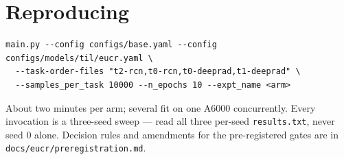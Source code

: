 \documentclass{article}
\begin{document}
\section{Reproducing}

\begin{verbatim}
main.py --config configs/base.yaml --config configs/models/til/eucr.yaml \
  --task-order-files "t2-rcn,t0-rcn,t0-deeprad,t1-deeprad" \
  --samples_per_task 10000 --n_epochs 10 --expt_name <arm>
\end{verbatim}

About two minutes per arm; several fit on one A6000 concurrently. Every
invocation is a three-seed sweep --- read all three per-seed
\texttt{results.txt}, never seed 0 alone. Decision rules and amendments for the
pre-registered gates are in \texttt{docs/eucr/preregistration.md}.
\end{document}
